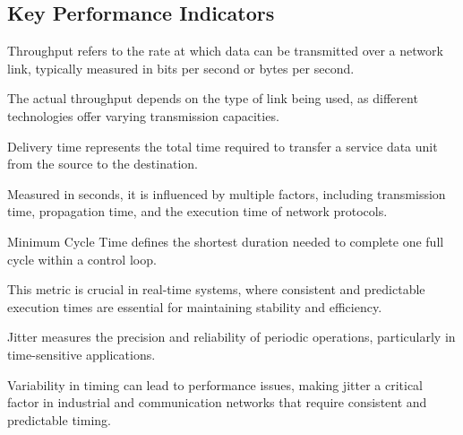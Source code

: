 \subsection{Key Performance Indicators}
\begin{definition}
    Throughput refers to the rate at which data can be transmitted over a network link, typically measured in bits per second or bytes per second.
\end{definition}
\noindent The actual throughput depends on the type of link being used, as different technologies offer varying transmission capacities.
\begin{definition}
    Delivery time represents the total time required to transfer a service data unit from the source to the destination.
\end{definition}
\noindent Measured in seconds, it is influenced by multiple factors, including transmission time, propagation time, and the execution time of network protocols.
\begin{definition}
    Minimum Cycle Time defines the shortest duration needed to complete one full cycle within a control loop. 
\end{definition}
\noindent This metric is crucial in real-time systems, where consistent and predictable execution times are essential for maintaining stability and efficiency.
\begin{definition}
    Jitter measures the precision and reliability of periodic operations, particularly in time-sensitive applications.
\end{definition}
\noindent Variability in timing can lead to performance issues, making jitter a critical factor in industrial and communication networks that require consistent and predictable timing.

